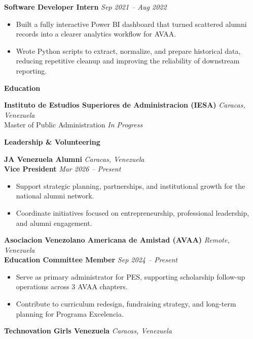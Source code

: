 \documentclass[11pt]{article}
\begin{document}
\textbf{Software Developer Intern} \hfill \textit{Sep 2021 -- Aug 2022}
\begin{itemize}
    \item Built a fully interactive Power BI dashboard that turned scattered alumni records into a clearer analytics workflow for AVAA.
    \item Wrote Python scripts to extract, normalize, and prepare historical data, reducing repetitive cleanup and improving the reliability of downstream reporting.
\end{itemize}
\vspace{8pt}
\begin{center}
    \textbf{Education}
\end{center}
\vspace{-4pt}
\textbf{Instituto de Estudios Superiores de Administracion (IESA)} \hfill \textit{Caracas, Venezuela} \\
Master of Public Administration \hfill \textit{In Progress}
\vspace{8pt}
\begin{center}
    \textbf{Leadership \& Volunteering}
\end{center}
\vspace{-4pt}
\textbf{JA Venezuela Alumni} \hfill \textit{Caracas, Venezuela} \\
\textbf{Vice President} \hfill \textit{Mar 2026 -- Present}
\begin{itemize}
    \item Support strategic planning, partnerships, and institutional growth for the national alumni network.
    \item Coordinate initiatives focused on entrepreneurship, professional leadership, and alumni engagement.
\end{itemize}
\vspace{10pt}
\textbf{Asociacion Venezolano Americana de Amistad (AVAA)} \hfill \textit{Remote, Venezuela} \\
\textbf{Education Committee Member} \hfill \textit{Sep 2024 -- Present}
\begin{itemize}
    \item Serve as primary administrator for PES, supporting scholarship follow-up operations across 3 AVAA chapters.
    \item Contribute to curriculum redesign, fundraising strategy, and long-term planning for Programa Excelencia.
\end{itemize}
\vspace{10pt}
\textbf{Technovation Girls Venezuela} \hfill \textit{Caracas, Venezuela} \\
\end{document}

